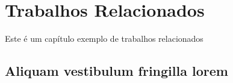 \chapter{Trabalhos Relacionados}
Este é um capítulo exemplo de trabalhos relacionados
\section{Aliquam vestibulum fringilla lorem}

\lipsum[1]

\lipsum[2-3]